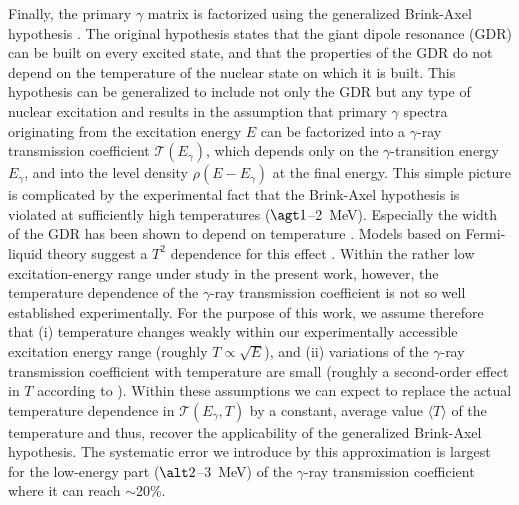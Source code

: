 \begin{multicols}{2}
Finally, the primary $\gamma$ matrix is factorized using the generalized 
Brink-Axel hypothesis \cite{Br55,Ax62}. The original hypothesis states that the
giant dipole resonance (GDR) can be built on every excited state, and that the 
properties of the GDR do not depend on the temperature of the nuclear state on 
which it is built. This hypothesis can be generalized to include not only the 
GDR but any type of nuclear excitation and results in the assumption that 
primary $\gamma$ spectra originating from the excitation energy $E$ can be 
factorized into a $\gamma$-ray transmission coefficient 
${\mathcal{T}}(E_\gamma)$, which depends only on the $\gamma$-transition energy
$E_\gamma$, and into the level density $\rho(E-E_\gamma)$ at the final energy.
This simple picture is complicated by the experimental fact that the Brink-Axel
hypothesis is violated at sufficiently high temperatures ($\agt 1$--2~MeV). 
Especially the width of the GDR has been shown to depend on temperature 
\cite{RA00}. Models based on Fermi-liquid theory suggest a $T^2$ dependence for
this effect \cite{KM83,Si86}. Within the rather low excitation-energy range 
under study in the present work, however, the temperature dependence of the 
$\gamma$-ray transmission coefficient is not so well established 
experimentally. For the purpose of this work, we assume therefore that (i) 
temperature changes weakly within our experimentally accessible excitation 
energy range (roughly $T\propto\sqrt{E}$), and (ii) variations of the 
$\gamma$-ray transmission coefficient with temperature are small (roughly a 
second-order effect in $T$ according to \cite{KM83}). Within these assumptions 
we can expect to replace the actual temperature dependence in 
${\mathcal{T}}(E_\gamma,T)$ by a constant, average value $\langle T\rangle$ of 
the temperature and thus, recover the applicability of the generalized 
Brink-Axel hypothesis. The systematic error we introduce by this approximation
is largest for the low-energy part ($\alt 2$--3~MeV) of the $\gamma$-ray 
transmission coefficient where it can reach $\sim$20\%.


\end{multicols}
